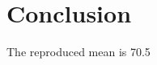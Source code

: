 \documentclass{article}
\begin{document}
\begin{abstract}
Candidate reaches 70.5%
\end{abstract}
\section{Conclusion}
The reproduced mean is 70.5%
\end{document}
